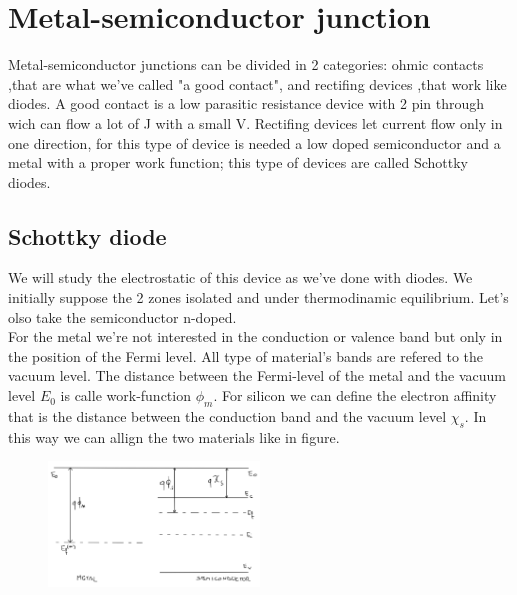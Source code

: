 \chapter{Metal-semiconductor junction}
Metal-semiconductor junctions can be divided in 2 categories: ohmic contacts ,that are what we've called "a good contact", and rectifing devices ,that work like diodes. A good contact is a low parasitic resistance device with 2 pin through wich can flow a lot of J with a small V. Rectifing devices let current flow only in one direction, for this type of device is needed a low doped semiconductor and a metal with a proper work function; this type of devices are called Schottky diodes.

\section{Schottky diode}
We will study the electrostatic of this device as we've done with diodes. We initially suppose the 2 zones isolated and under thermodinamic equilibrium. Let's olso take the semiconductor n-doped.\\
For the metal we're not interested in the conduction or valence band but only in the position of the Fermi level. All type of material's bands are refered to the vacuum level. The distance between the Fermi-level of the metal and the vacuum level $E_0$ is calle work-function $\phi_m$. For silicon we can define the electron affinity that is the distance between the conduction band and the vacuum level $\chi_s$. In this way we can allign the two materials like in figure.\\

\begin{figure}
\includegraphics[width=0.5\textwidth]{ms1.png}
\end{figure}

